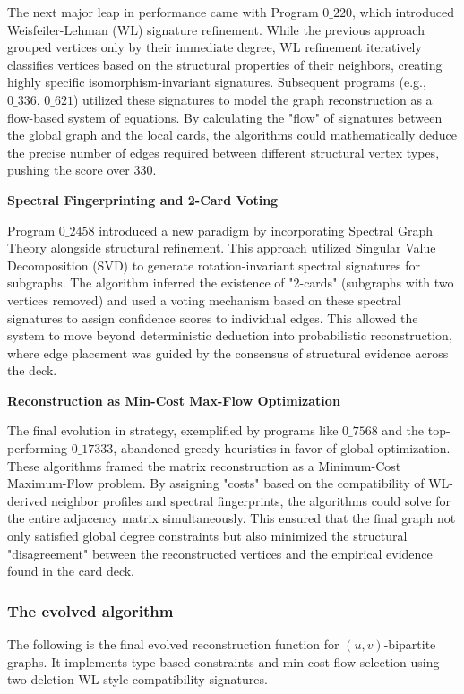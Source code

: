 \documentclass[11pt]{amsart}
\begin{document}
\begin{tcolorbox}[
  enhanced,
  breakable,
  title={Gemini-generated summary},
  colback=gray!3,
  colframe=black!30,
  title after break={Gemini-generated summary (continued)}
]
The next major leap in performance came with Program $0\_220$, which introduced Weisfeiler-Lehman (WL) signature refinement. While the previous approach grouped vertices only by their immediate degree, WL refinement iteratively classifies vertices based on the structural properties of their neighbors, creating highly specific isomorphism-invariant signatures. Subsequent programs (e.g., $0\_336$, $0\_621$) utilized these signatures to model the graph reconstruction as a flow-based system of equations. By calculating the "flow" of signatures between the global graph and the local cards, the algorithms could mathematically deduce the precise number of edges required between different structural vertex types, pushing the score over 330.

\noindent \textbf{Spectral Fingerprinting and 2-Card Voting}

Program $0\_2458$ introduced a new paradigm by incorporating Spectral Graph Theory alongside structural refinement. This approach utilized Singular Value Decomposition (SVD) to generate rotation-invariant spectral signatures for subgraphs. The algorithm inferred the existence of "2-cards" (subgraphs with two vertices removed) and used a voting mechanism based on these spectral signatures to assign confidence scores to individual edges. This allowed the system to move beyond deterministic deduction into probabilistic reconstruction, where edge placement was guided by the consensus of structural evidence across the deck.

\noindent \textbf{Reconstruction as Min-Cost Max-Flow Optimization}

The final evolution in strategy, exemplified by programs like $0\_7568$ and the top-performing $0\_17333$, abandoned greedy heuristics in favor of global optimization. These algorithms framed the matrix reconstruction as a Minimum-Cost Maximum-Flow problem. By assigning "costs" based on the compatibility of WL-derived neighbor profiles and spectral fingerprints, the algorithms could solve for the entire adjacency matrix simultaneously. This ensured that the final graph not only satisfied global degree constraints but also minimized the structural "disagreement" between the reconstructed vertices and the empirical evidence found in the card deck.
\end{tcolorbox}

\subsubsection{The evolved algorithm} The following is the final evolved reconstruction function for $(u,v)$-bipartite graphs. It implements type-based constraints and min-cost flow selection using two-deletion WL-style compatibility signatures.
\end{document}
